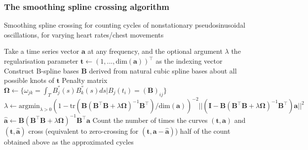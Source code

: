 \documentclass[
]{article}
\begin{document}
\hypertarget{the-smoothing-spline-crossing-algorithm}{%
\subsubsection{The smoothing spline crossing
algorithm}\label{the-smoothing-spline-crossing-algorithm}}

\begin{algorithm}
\caption{Smoothing spline crossing for counting cycles of nonstationary pseudosinusoidal oscillations, for varying heart rates/chest movements}
\begin{algorithmic}[1]
\STATE Take a time series vector $\mathbf{a}$ at any frequency, and the optional argument $\lambda$ the regularisation parameter
\STATE $\mathbf{t} \leftarrow (1, ..., \text{dim}(\mathbf{a}))^\top$ as the indexing vector
\STATE Construct B-spline bases $\mathbf{B}$ derived from natural cubic spline bases about all possible knots of $\mathbf{t}$
\STATE Penalty matrix $\boldsymbol{\Omega} \leftarrow \{\omega_{jk} = \int_T {B_j^{''}(s)B_k^{''}(s)}ds | B_j(t_i) = (\mathbf{B})_{ij}\}$
\STATE $\lambda \leftarrow \text{argmin}_{\lambda > 0} (1 - \text{tr}(\mathbf{B}(\mathbf{B}^\top\mathbf{B} + \lambda\boldsymbol{\Omega})^{-1}\mathbf{B}^\top) / \text{dim}(\mathbf{a}))^{-2}||(\mathbf{I} - \mathbf{B}(\mathbf{B}^\top\mathbf{B} + \lambda\boldsymbol{\Omega})^{-1}\mathbf{B}^\top)\mathbf{a}||^2$
\ENDIF
\STATE $\mathbf{\hat{a}} \leftarrow \mathbf{B}(\mathbf{B}^\top\mathbf{B} + \lambda\boldsymbol{\Omega})^{-1}\mathbf{B}^\top\mathbf{a}$
\STATE Count the number of times the curves $(\mathbf{t}, \mathbf{a})$ and $(\mathbf{t}, \mathbf{\hat{a}})$ cross (equivalent to zero-crossing for $(\mathbf{t}, \mathbf{a} - \mathbf{\hat{a}})$)
\RETURN half of the count obtained above as the approximated cycles
\end{algorithmic}
\end{algorithm}
\end{document}
